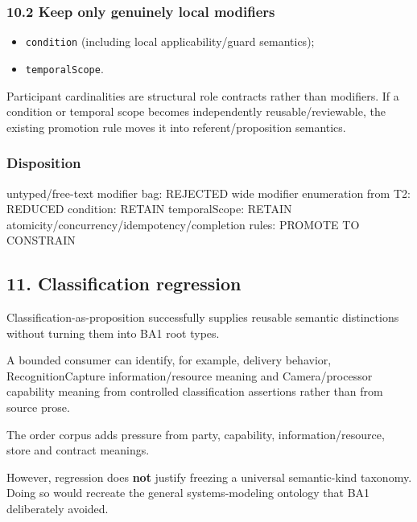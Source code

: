 \documentclass[
  10pt,
  a4paper,
]{article}
\newenvironment{Shaded}{}{}
\newcommand{\NormalTok}[1]{#1}
\providecommand{\tightlist}{%
  \setlength{\itemsep}{0pt}\setlength{\parskip}{0pt}}
\begin{document}
\subsubsection{10.2 Keep only genuinely local
modifiers}\label{102-keep-only-genuinely-local-modifiers}

\begin{itemize}
\tightlist
\item
  \texttt{condition} (including local applicability/guard semantics);
\item
  \texttt{temporalScope}.
\end{itemize}

Participant cardinalities are structural role contracts rather than
modifiers. If a condition or temporal scope becomes independently
reusable/reviewable, the existing promotion rule moves it into
referent/proposition semantics.

\subsubsection{Disposition}\label{disposition-1}

\begin{Shaded}
\begin{Highlighting}[]
\NormalTok{untyped/free{-}text modifier bag: REJECTED}
\NormalTok{wide modifier enumeration from T2: REDUCED}
\NormalTok{condition: RETAIN}
\NormalTok{ temporalScope: RETAIN}
\NormalTok{atomicity/concurrency/idempotency/completion rules: PROMOTE TO CONSTRAIN}
\end{Highlighting}
\end{Shaded}

\subsection{11. Classification
regression}\label{11-classification-regression}

Classification-as-proposition successfully supplies reusable semantic
distinctions without turning them into BA1 root types.

A bounded consumer can identify, for example, delivery behavior,
RecognitionCapture information/resource meaning and Camera/processor
capability meaning from controlled classification assertions rather than
from source prose.

The order corpus adds pressure from party, capability,
information/resource, store and contract meanings.

However, regression does \textbf{not} justify freezing a universal
semantic-kind taxonomy. Doing so would recreate the general
systems-modeling ontology that BA1 deliberately avoided.
\end{document}

